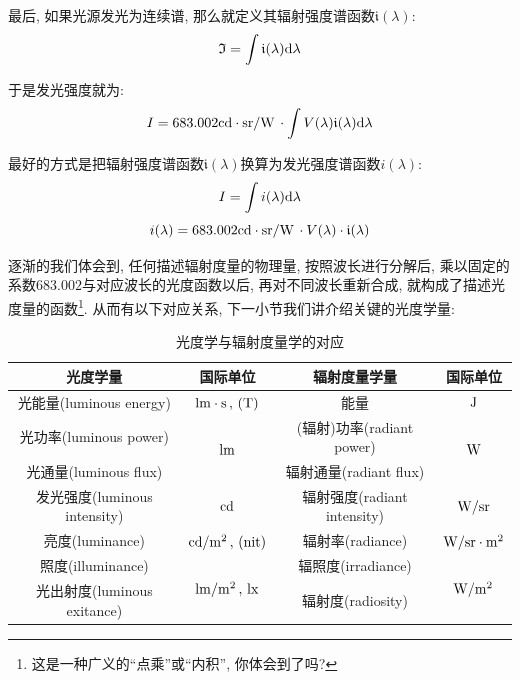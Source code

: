 最后, 如果光源发光为连续谱, 那么就定义其辐射强度谱函数$\mathfrak{i}(\lambda)$:
\[\mathfrak{I}=\int \mathfrak{i}(\lambda)\textrm{d} \lambda\]

于是发光强度就为:
\[I=683.002{\rm cd\cdot sr/W}\,\cdot \int V(\lambda)\mathfrak{i}(\lambda)\textrm{d} \lambda\]

最好的方式是把辐射强度谱函数$\mathfrak{i}(\lambda)$换算为发光强度谱函数$i(\lambda)$:
\[I=\int i(\lambda)\textrm{d} \lambda\]
\[i(\lambda)=683.002{\rm cd\cdot sr/W}\,\cdot V(\lambda)\cdot \mathfrak{i}(\lambda)\]

逐渐的我们体会到, 任何描述辐射度量的物理量, 按照波长进行分解后, 乘以固定的系数$683.002$与对应波长的光度函数以后, 再对不同波长重新合成, 就构成了描述光度量的函数\footnote{这是一种广义的``点乘''或``内积'', 你体会到了吗?}. 从而有以下对应关系, 下一小节我们讲介绍关键的光度学量:

\begin{table}[H]
\centering
\caption{光度学与辐射度量学的对应}
\begin{tabular}{cc|cc}
\toprule
光度学量& 国际单位&辐射度量学量&国际单位\\
\midrule
光能量(luminous energy)&${\rm lm\cdot s\,,\, (T)}$&能量&${\rm J}$\\\midrule
光功率(luminous power)&\multirow{2}{*}{${\rm lm}$}&(辐射)功率(radiant power)&\multirow{2}{*}{${\rm W}$}\\
\cmidrule{1-1}\cmidrule{3-3}
光通量(luminous flux)& &辐射通量(radiant flux)& \\\midrule
发光强度(luminous intensity)&${\rm cd}$&辐射强度(radiant intensity)&${\rm W/sr}$\\\midrule
亮度(luminance)&${\rm cd/m^2\,,\,(nit)}$&辐射率(radiance)&${\rm W/sr\cdot m^2}$\\\midrule
照度(illuminance)&\multirow{2}{*}{${\rm lm/m^2\,,\, lx}$}&辐照度(irradiance)&\multirow{2}{*}{${\rm W/m^2}$}\\
\cmidrule{1-1}\cmidrule{3-3}
光出射度(luminous exitance)&&辐射度(radiosity)&\\
\bottomrule
\end{tabular}
\end{table}

